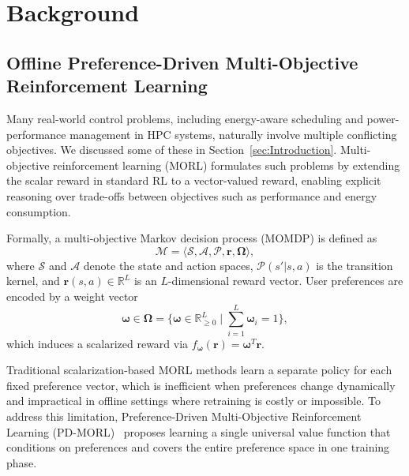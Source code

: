 \section{Background}

\subsection{Offline Preference-Driven Multi-Objective Reinforcement Learning}
\label{sec:PDMORL}

Many real-world control problems, including energy-aware scheduling and power-performance management in HPC systems, naturally involve multiple conflicting objectives. We discussed some of these in Section~\ref{sec:Introduction}. Multi-objective reinforcement learning (MORL) formulates such problems by extending the scalar reward in standard RL to a vector-valued reward, enabling explicit reasoning over trade-offs between objectives such as performance and energy consumption.

Formally, a multi-objective Markov decision process (MOMDP) is defined as
\begin{equation}
    \mathcal{M} = \langle \mathcal{S}, \mathcal{A}, \mathcal{P}, 
    \mathbf{r}, \boldsymbol{\Omega} \rangle,
    \label{eq:MOMDP}
\end{equation}
where $\mathcal{S}$ and $\mathcal{A}$ denote the state and action spaces, $\mathcal{P}(s'\vert s,a)$ is the transition kernel, and $\mathbf{r}(s,a) \in \mathbb{R}^L$ is an $L$-dimensional reward vector. User preferences are encoded by a weight vector
\begin{equation}
    \boldsymbol{\omega} \in \boldsymbol{\Omega} = \Big\{
    \boldsymbol{\omega} \in \mathbb{R}^L_{\geq 0} \;\Big\vert\; 
    \sum^{L}_{i=1}\boldsymbol{\omega}_i = 1 \Big\},
    \label{eq:preference_weight_vector}
\end{equation}
which induces a scalarized reward via $f_{\boldsymbol{\omega}}(\mathbf{r}) = \boldsymbol{\omega}^T\mathbf{r}$.

Traditional scalarization-based MORL methods learn a separate policy for each fixed preference vector, which is inefficient when preferences change dynamically and impractical in offline settings where retraining is costly or impossible. To address this limitation, Preference-Driven Multi-Objective Reinforcement Learning (PD-MORL)~\cite{basaklar2023pdmorlpreferencedrivenmultiobjectivereinforcement} proposes learning a single universal value function that conditions on preferences and covers the entire preference space in one training phase.


